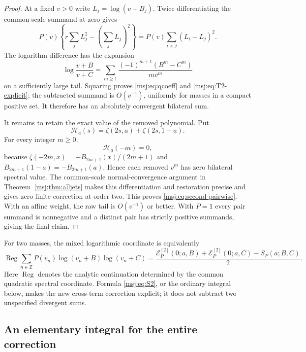 \begin{proof}
At a fixed $v>0$ write $L_j=\log(v+B_j)$. Twice differentiating the
common-scale summand at zero gives
\[
 P(v)\left\{r\sum_jL_j^2-\left(\sum_jL_j\right)^2\right\}
        =P(v)\sum_{i<j}(L_i-L_j)^2.
\]
The logarithm difference has the expansion
\[
 \log\frac{v+B}{v+C}
   =\sum_{m\ge1}\frac{(-1)^{m+1}(B^m-C^m)}{m v^m}
\]
on a sufficiently large tail. Squaring proves
\eqref{msj:eq:qcoeff} and \eqref{msj:eq:T2-explicit}; the subtracted
summand is $O(v^{-1})$, uniformly for masses in a compact positive set.
It therefore has an absolutely convergent bilateral sum.

It remains to retain the exact value of the removed polynomial. Put
\begin{equation}
 \mathcal H_a(s)=\zeta(2s,a)+\zeta(2s,1-a).
 \label{msj:eq:H}
\end{equation}
For every integer $m\ge0$,
\begin{equation}
 \mathcal H_a(-m)=0,
 \label{msj:eq:trivial-zero}
\end{equation}
because $\zeta(-2m,x)=-B_{2m+1}(x)/(2m+1)$ and
$B_{2m+1}(1-a)=-B_{2m+1}(a)$. Hence each removed $v^m$ has zero
bilateral spectral value. The common-scale normal-convergence argument
in Theorem~\ref{msj:thm:alljets} makes this differentiation and restoration
precise and gives zero finite correction at order two. This proves
\eqref{msj:eq:second-pairwise}. With an affine weight, the raw tail is
$O(v^{-1})$ or better. With $P=1$ every pair summand is nonnegative and
a distinct pair has strictly positive summands, giving the final claim.
\end{proof}

For two masses, the mixed logarithmic coordinate is equivalently
\begin{equation}
 \operatorname{Reg}\sum_{n\in\mathbb Z}
  P(v_n)\log(v_n+B)\log(v_n+C)
 =\frac{\mathcal E_P^{[2]}(0;a,B)+\mathcal E_P^{[2]}(0;a,C)
                     -S_P(a;B,C)}2.
 \label{msj:eq:cross-term}
\end{equation}
Here $\operatorname{Reg}$ denotes the analytic continuation determined
by the common quadratic spectral coordinate. Formula
\eqref{msj:eq:S2}, or the ordinary integral below, makes the new
cross-term correction explicit; it does not subtract two unspecified
divergent sums.

\subsection{An elementary integral for the entire correction}

